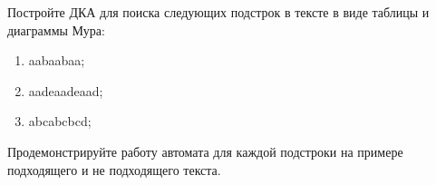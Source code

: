 \question 
Постройте ДКА для поиска следующих подстрок в тексте в виде таблицы и диаграммы Мура:
\begin{enumerate}
\item  aabaabaa;
\item  aadeaadeaad;
\item  abcabcbcd;
\end{enumerate}
Продемонстрируйте работу автомата для каждой подстроки на примере подходящего и не подходящего текста.